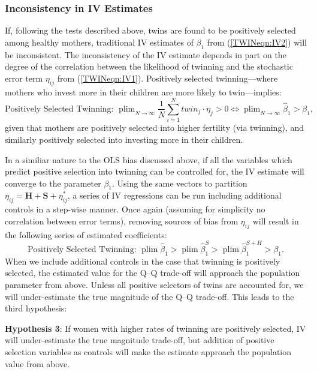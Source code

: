 \documentclass[subeqn]{article}
\DeclareMathOperator{\plim}{plim}
\begin{document}
\begin{spacing}{1.4}
\subsubsection{Inconsistency in IV Estimates}
\label{sscn:inconsistentIV}
If, following the tests described above, twins are found to be positively selected
among healthy mothers, traditional IV estimates of $\beta_1$ from (\ref{TWINeqn:IV2})
will be inconsistent.  The inconsistency of the IV estimate depends in part on the
degree of the correlation between the likelihood of twinning and the stochastic error
term $\eta_{ij}$ from (\ref{TWINeqn:IV1}).  Positively selected twinning---where
mothers who invest more in their children are more likely to twin---implies:
\begin{equation}
  \text{Positively Selected Twinning:\ \ \ }  \plim_{N\rightarrow\infty} \frac{1}{N}\sum_{i=1}^Ntwin_j\cdot \eta_j > 0 \Leftrightarrow \plim_{N\rightarrow\infty}\hat\beta_1 > \beta_1, \nonumber
\end{equation}
given that mothers are positively selected into higher fertility (via twinning),
and similarly positively selected into investing more in their children.

In a similiar nature to the OLS bias discussed above, if all the variables
which predict positive selection into twinning can be controlled for, the
IV estimate will converge to the parameter $\beta_1$.  Using the same vectors
to partition $\eta_{ij}=\bm{H}+\bm{S}+\eta^*_{ij}$, a series of IV regressions
can be run including additional controls in a step-wise manner.  Once again
(assuming for simplicity no correlation between error terms), removing sources
of bias from $\eta_{ij}$ will result in the following series of estimated
coefficients:
\begin{equation}
  \text{Positively Selected Twinning:\ \ \ } \plim \hat\beta_1 > \plim\hat\beta_1^{S} > \plim\hat\beta_1^{S+H} > \beta_1. \nonumber
\end{equation}
When we include additional controls in the case that twinning is positively
selected, the estimated value for the Q--Q trade-off will approach the population
parameter from above.  Unless all positive selectors of twins are
accounted for, we will under-estimate the true magnitude of the Q--Q trade-off.
This leads to the third hypothesis:

\noindent \textbf{Hypothesis 3}: If women with higher rates of twinning are
positively selected, IV will under-estimate the true magnitude trade-off, but
addition of positive selection variables as controls will make the estimate
approach the population value from above.



\end{spacing}
\end{document}

